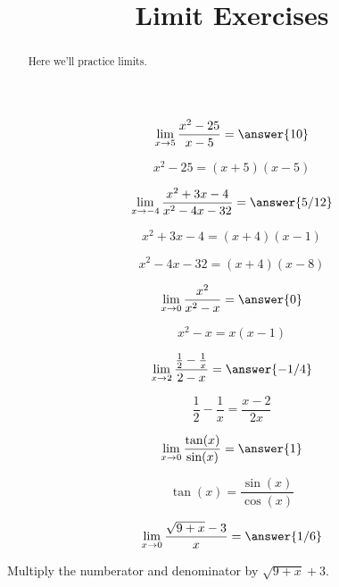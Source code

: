 \documentclass[handout]{ximera}
\title{Limit Exercises}
\begin{document}
\begin{abstract}
  Here we'll practice limits.
\end{abstract}
\maketitle

\begin{exercise}
\[\lim_{x \to 5} \frac{x^2-25}{x-5} = \answer{10}\]
\begin{hint}
	\[x^2-25 = (x+5)(x-5)\]
\end{hint}
\end{exercise}


\begin{exercise}
\[\lim_{x \to -4} \frac{x^2+3x-4}{x^2-4x-32} = \answer{5/12}\]
\begin{hint}
	\[x^2+3x-4 = (x+4)(x-1)\]
\end{hint}
\begin{hint}
	\[x^2-4x-32 = (x+4)(x-8)\]
\end{hint}
\end{exercise}

\begin{exercise}
\[\lim_{x \to 0} \frac{x^2}{x^2-x} = \answer{0}\]
\begin{hint}
	\[x^2-x = x(x-1)\]
\end{hint}

\end{exercise}

\begin{exercise}
\[\lim_{x \to 2} \frac{\frac{1}{2}-\frac{1}{x}}{2-x} = \answer{-1/4}\]
\begin{hint}
	\[\frac{1}{2}-\frac{1}{x} = \frac{x-2}{2x} \]
\end{hint}
\end{exercise}

\begin{exercise}
\[\lim_{x \to 0} \frac{\tan(x)}{\sin(x)} = \answer{1}\]
\begin{hint}
	\[\tan(x) = \frac{\sin(x)}{\cos(x)}\]
\end{hint}
\end{exercise}

\begin{exercise}
\[\lim_{x \to 0} \frac{\sqrt{9+x}-3}{x} = \answer{1/6}\]
\begin{hint}
	Multiply the numberator and denominator by $\sqrt{9+x}+3$.
\end{hint}
\end{exercise}
\end{document}

